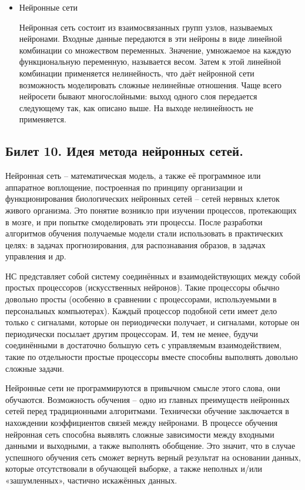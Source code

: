 \documentclass[a4paper, 12pt]{article}
\begin{document}
\begin{itemize}
		\item Нейронные сети
		
		Нейронная сеть состоит из взаимосвязанных групп узлов, называемых нейронами. Входные данные передаются в эти нейроны в виде линейной комбинации со множеством переменных. Значение, умножаемое на каждую функциональную переменную, называется весом. Затем к этой линейной комбинации применяется нелинейность, что даёт нейронной сети возможность моделировать сложные нелинейные отношения. Чаще всего нейросети бывают многослойными: выход одного слоя передается следующему так, как описано выше. На выходе нелинейность не применяется.
	\end{itemize}
	
	\subsection*{Билет 10. Идея метода нейронных сетей.}
	Нейронная сеть -- математическая модель, а также её программное или аппаратное воплощение, построенная по принципу организации и функционирования биологических нейронных сетей -- сетей нервных клеток живого организма. Это понятие возникло при изучении процессов, протекающих в мозге, и при попытке смоделировать эти процессы. После разработки алгоритмов обучения получаемые модели стали использовать в практических целях: в задачах прогнозирования, для распознавания образов, в задачах управления и др.
	
	НС представляет собой систему соединённых и взаимодействующих между собой простых процессоров (искусственных нейронов). Такие процессоры обычно довольно просты (особенно в сравнении с процессорами, используемыми в персональных компьютерах). Каждый процессор подобной сети имеет дело только с сигналами, которые он периодически получает, и сигналами, которые он периодически посылает другим процессорам. И, тем не менее, будучи соединёнными в достаточно большую сеть с управляемым взаимодействием, такие по отдельности простые процессоры вместе способны выполнять довольно сложные задачи.
	
	Нейронные сети не программируются в привычном смысле этого слова, они обучаются. Возможность обучения -- одно из главных преимуществ нейронных сетей перед традиционными алгоритмами. Технически обучение заключается в нахождении коэффициентов связей между нейронами. В процессе обучения нейронная сеть способна выявлять сложные зависимости между входными данными и выходными, а также выполнять обобщение. Это значит, что в случае успешного обучения сеть сможет вернуть верный результат на основании данных, которые отсутствовали в обучающей выборке, а также неполных и/или «зашумленных», частично искажённых данных.
	
\end{document}
